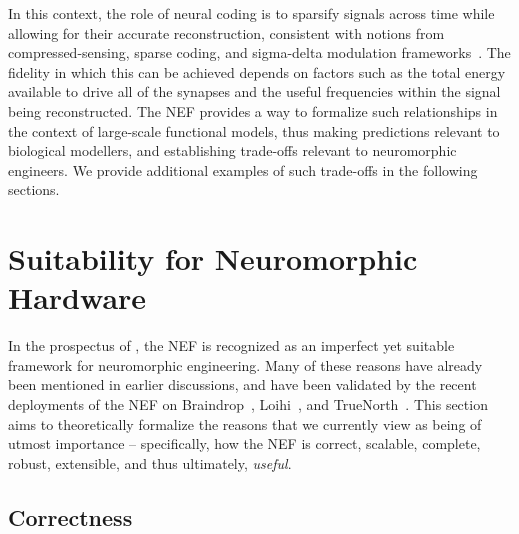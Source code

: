 In this context, the role of neural coding is to sparsify signals across time while allowing for their accurate reconstruction, consistent with notions from compressed-sensing, sparse coding, and sigma-delta modulation frameworks~\citep{coulter2010adaptive, chklovskii2012neuronal, yoon2017lif}.
The fidelity in which this can be achieved depends on factors such as the total energy available to drive all of the synapses and the useful frequencies within the signal being reconstructed.
The NEF provides a way to formalize such relationships in the context of large-scale functional models, thus making predictions relevant to biological modellers, and establishing trade-offs relevant to neuromorphic engineers.
We provide additional examples of such trade-offs in the following sections.

\section{Suitability for Neuromorphic Hardware}
\label{sec:nef-suitability}

In the prospectus of \citet{boahen2017neuromorph}, the NEF is recognized as an imperfect yet suitable framework for neuromorphic engineering.
Many of these reasons have already been mentioned in earlier discussions, and have been 
validated by the recent deployments of the NEF on Braindrop~\citep{braindrop2019}, Loihi~\citep{blouw2018a}, and TrueNorth~\citep{fischl2018}.
This section aims to theoretically formalize the reasons that we currently view as being of utmost importance -- specifically, how the NEF is correct, scalable, complete, robust, extensible, and thus ultimately, \emph{useful}.

\subsection{Correctness} %
\label{sec:spike-coding}

